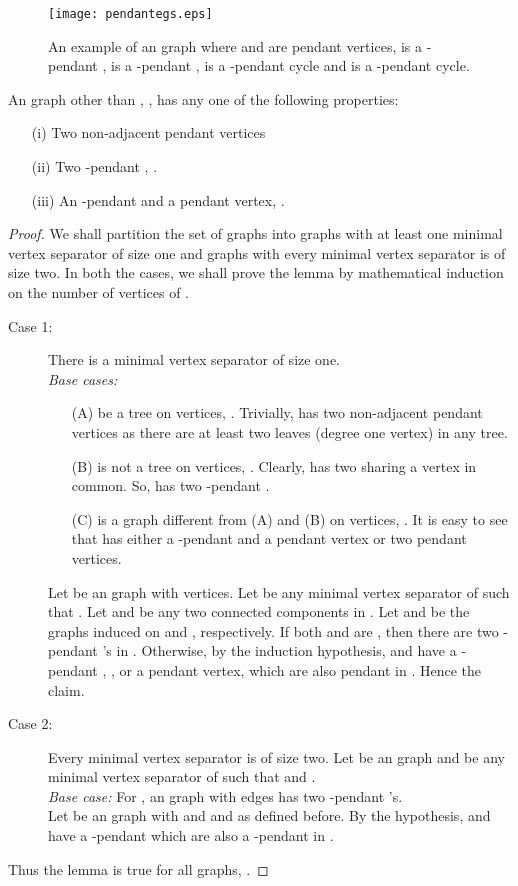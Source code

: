 \documentclass[runningheads]{llncs}
\begin{document}
\begin{figure}[h]
\centering
\texttt{[image: pendantegs.eps]}
\caption{An example of an  graph where  and  are pendant vertices,  is a -pendant ,  is a -pendant ,  is a -pendant cycle and  is a -pendant cycle.}
\end{figure}

\begin{lemma}
\label{specialvertex2k+1}
An  graph  other than , , has any one of the following properties:
\begin{itemize}
\item[(i)] Two non-adjacent pendant vertices
\item[(ii)] Two -pendant , .
\item[(iii)] An -pendant  and a pendant vertex, .
\end{itemize}
\end{lemma}
\begin{proof}
 We shall partition the set of  graphs into  graphs with at least one minimal vertex separator of size one and  graphs with every minimal vertex separator is of size two. In both the cases, we shall prove the lemma by mathematical induction on the number of vertices  of .
\begin{description}
\item[Case 1:] There is a minimal vertex separator of size one. \\
\noindent \emph{Base cases:} 
\begin{itemize}
\item[(A)]  be a tree on  vertices, . Trivially,  has two non-adjacent pendant vertices as there are at least two leaves (degree one vertex) in any tree.
\item[(B)]  is not a tree on  vertices, . Clearly,  has two  sharing a vertex in common. So,  has two -pendant .
\item[(C)]  is a graph different from (A) and (B) on  vertices, . It is easy to see that  has either a -pendant  and a pendant vertex or two pendant vertices.
\end{itemize}
\noindent Let  be an  graph with  vertices. Let  be any minimal vertex separator of  such that . Let  and  be any two connected components in . Let  and  be the graphs induced on  and  , respectively. If both  and  are , then there are two -pendant 's in . Otherwise, by the induction hypothesis,  and  have a -pendant , , or a pendant vertex, which are also pendant in . Hence the claim.
\item[Case 2:] Every minimal vertex separator is of size two. Let  be an  graph and  be any minimal vertex separator of  such that  and .\\
\noindent \emph{Base case:} For , an  graph with  edges has two -pendant 's.\\
\noindent Let  be an  graph with  and  and  as defined before. By the hypothesis,  and  have a -pendant  which are also a -pendant  in .
\end{description}
Thus the lemma is true for all  graphs, . 

\end{proof}
\end{document}
